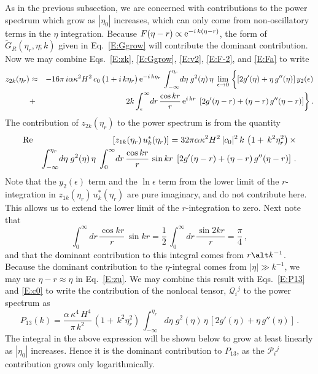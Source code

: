 \documentclass[preprint,prd,showpacs,superscriptaddress]{revtex4}
\begin{document}
As in the previous subsection, we are concerned with contributions to the power spectrum which grow as $|\eta_0|$ increases,
which can only come from non-oscillatory terms in the $\eta$ integration.   Because $F(\eta-r) \propto {\rm e}^{-i\,k (\eta-r)}$,
the form of $\widetilde{G}_{R}(\eta_r,\eta;{k})$ given in Eq.~\eqref{E:Ggrow} will contribute the dominant contribution.
Now we may combine Eqs.~\eqref{E:zk}, \eqref{E:Ggrow},  \eqref{E:v2},  \eqref{E:F-2}, and \eqref{E:Fa}  to write
\begin{eqnarray}
z_{2k}(\eta_r) &\approx& -16 \pi \,i \alpha \kappa^2 H^2\, c_0\, \bigl(1+i\,k\eta_r\bigr)\,  {\rm e}^{-i\,k \eta_r}\,
\int_{-\infty}^{\eta_{r}}\!d\eta \;g^{2}(\eta)\, \eta\;  \lim_{\epsilon \to 0}\; \biggl\{ [ 2g'(\eta) +\eta\, g''(\eta) ]\, y_2(\epsilon)   \nonumber \\
 &+& 2 k \int^{\infty}_{\epsilon}\!dr \, \frac{\cos kr}{r} \, {\rm e}^{i\,k r} \; \left[ 2g'(\eta-r) +(\eta -r)\, g''(\eta-r)     \right] \biggr\} \,.
\end{eqnarray}
The contribution of $z_{2k}(\eta_r)$ to the power spectrum is from the quantity
\begin{eqnarray}
&{\rm Re}& \left[ z_{1k}(\eta_r)\, u^\ast_k(\eta_r) \right]  = 32 \pi  \alpha \kappa^2 H^2\, |c_0|^2\, k\,\left(1+ \,k^2 \eta_r^2 \right) \times\nonumber \\
&&\int_{-\infty}^{\eta_{r}}\!d\eta \;g^{2}(\eta)\, \eta\; \int^{\infty}_{0}\!dr \, \frac{\cos kr}{r} \, \sin kr \; \left[ 2g'(\eta-r) +(\eta -r)\, g''(\eta-r)  \right] \,.
\label{E:zu}
\end{eqnarray}
Note that the $y_2(\epsilon)$ term and the $\ln \epsilon $ term from the lower limit of the $r$-integration in $z_{1k}(\eta_r)\, u^\ast_k(\eta_r)$
are pure imaginary, and do not contribute here. This allows us to extend the lower limit of the $r$-integration to zero. Next note that
\begin{equation}
\int^{\infty}_{0}\!dr \, \frac{\cos kr}{r} \, \sin kr = \frac{1}{2}\, \int^{\infty}_{0}\!dr \, \frac{\sin 2kr}{r} =\frac{\pi}{4}\,,
\end{equation}
and that the dominant contribution to this integral comes from $r\alt k^{-1}$. Because the dominant contribution to the $\eta$-integral
comes from $|\eta| \gg k^{-1}$, we may use $\eta -r \approx \eta$ in Eq.~\eqref{E:zu}. We may combine this result with Eqs.~\eqref{E:P13}
and \eqref{E:c0} to write the contribution of the nonlocal tensor, $\mathcal{Q}_{i}{}^{j}$ to the power spectrum as
\begin{equation}
P_{13}(k) = \frac{\alpha \, \kappa^4\, H^4}{\pi \, k^2} \, \left(1+ \,k^2 \eta_r^2 \right) \,
 \int_{-\infty}^{\eta_{r}}\!d\eta \;g^{2}(\eta)\, \eta\, \left[ 2g'(\eta) + \eta \, g''(\eta)  \right] \,.
 \label{E:P13f}
\end{equation}
The integral in the above expression will be shown below to grow at least linearly as $|\eta_0|$ increases. Hence it is the dominant
contribution to $P_{13}$, as the $\mathcal{P}_{i}{}^{j}$ contribution grows only logarithmically.
\end{document}
